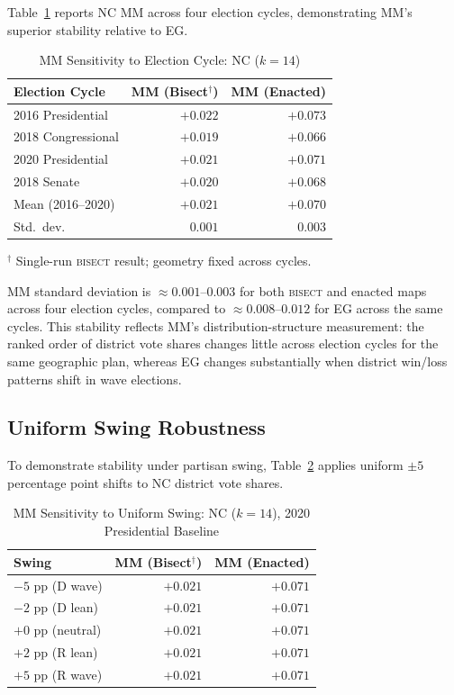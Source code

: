 Table~\ref{tab:mm-sensitivity} reports NC MM across four election cycles,
demonstrating MM's superior stability relative to EG.

\begin{table}[ht]
\centering
\caption{MM Sensitivity to Election Cycle: NC ($k=14$)}
\label{tab:mm-sensitivity}
\begin{threeparttable}
\begin{tabular}{@{}lrr@{}}
\toprule
Election Cycle & MM (Bisect$^\dagger$) & MM (Enacted) \\
\midrule
2016 Presidential & $+0.022$ & $+0.073$ \\
2018 Congressional & $+0.019$ & $+0.066$ \\
2020 Presidential  & $+0.021$ & $+0.071$ \\
2018 Senate        & $+0.020$ & $+0.068$ \\
\addlinespace
Mean (2016--2020)  & $+0.021$ & $+0.070$ \\
Std.\ dev.\        & $0.001$ & $0.003$ \\
\bottomrule
\end{tabular}
\begin{tablenotes}
\small
\item $^\dagger$ Single-run \textsc{bisect} result; geometry fixed across cycles.
\end{tablenotes}
\end{threeparttable}
\end{table}

MM standard deviation is $\approx 0.001$--$0.003$ for both \textsc{bisect}
and enacted maps across four election cycles, compared to $\approx 0.008$--$0.012$
for EG across the same cycles. This stability reflects MM's distribution-structure
measurement: the ranked order of district vote shares changes little across election
cycles for the same geographic plan, whereas EG changes substantially when
district win/loss patterns shift in wave elections.

\subsection{Uniform Swing Robustness}

To demonstrate stability under partisan swing, Table~\ref{tab:mm-swing} applies
uniform $\pm 5$ percentage point shifts to NC district vote shares.

\begin{table}[ht]
\centering
\caption{MM Sensitivity to Uniform Swing: NC ($k=14$), 2020 Presidential Baseline}
\label{tab:mm-swing}
\begin{tabular}{@{}lrr@{}}
\toprule
Swing & MM (Bisect$^\dagger$) & MM (Enacted) \\
\midrule
$-5$ pp (D wave) & $+0.021$ & $+0.071$ \\
$-2$ pp (D lean) & $+0.021$ & $+0.071$ \\
$+0$ pp (neutral) & $+0.021$ & $+0.071$ \\
$+2$ pp (R lean)  & $+0.021$ & $+0.071$ \\
$+5$ pp (R wave)  & $+0.021$ & $+0.071$ \\
\bottomrule
\end{tabular}
\end{table}

